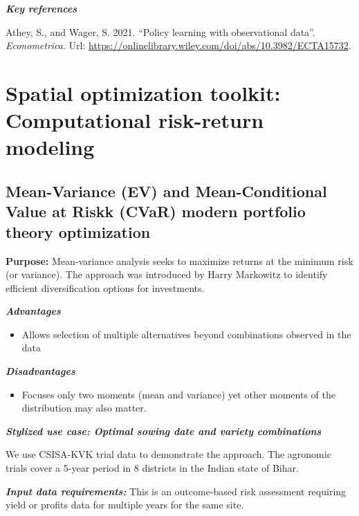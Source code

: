 \documentclass[
  letterpaper,
  DIV=11,
  numbers=noendperiod]{scrreprt}
\providecommand{\tightlist}{%
  \setlength{\itemsep}{0pt}\setlength{\parskip}{0pt}}\usepackage{longtable,booktabs,array}
\begin{document}
\textbf{\emph{Key references}}

Athey, S., and Wager, S. 2021. ``Policy learning with observational
data''. \emph{Econometrica}. Url:
\url{https://onlinelibrary.wiley.com/doi/abs/10.3982/ECTA15732}.


\chapter{Spatial optimization toolkit: Computational risk-return
modeling}\label{spatial-optimization-toolkit-computational-risk-return-modeling}

\section{Mean-Variance (EV) and Mean-Conditional Value at Riskk (CVaR)
modern portfolio theory
optimization}\label{mean-variance-ev-and-mean-conditional-value-at-riskk-cvar-modern-portfolio-theory-optimization}

\textbf{Purpose:} Mean-variance analysis seeks to maximize returns at
the minimum risk (or variance). The approach was introduced by Harry
Markowitz to identify efficient diversification options for investments.

\textbf{\emph{Advantages}}

\begin{itemize}
\tightlist
\item
  Allows selection of multiple alternatives beyond combinations observed
  in the data
\end{itemize}

\textbf{\emph{Disadvantages}}

\begin{itemize}
\tightlist
\item
  Focuses only two moments (mean and variance) yet other moments of the
  distribution may also matter.
\end{itemize}

\textbf{\emph{Stylized use case: Optimal sowing date and variety
combinations}}

We use CSISA-KVK trial data to demonstrate the approach. The agronomic
trials cover a 5-year period in 8 districts in the Indian state of
Bihar.

\textbf{\emph{Input data requirements:}} This is an outcome-based risk
assessment requiring yield or profits data for multiple years for the
same site.
\end{document}
